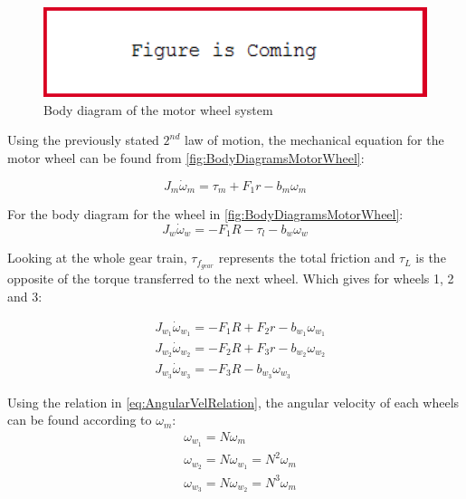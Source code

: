 \begin{figure}[htbp]
    \centering
    \includegraphics[width=1\textwidth]{figures/FigureIsComing.PNG}
    \caption{Body diagram of the motor wheel system}
    \label{fig:BodyDiagramsMotorWheel}
\end{figure}

Using the previously stated $2^{nd}$ law of motion, the mechanical equation for the motor wheel can be found from \autoref{fig:BodyDiagramsMotorWheel}:

\begin{equation}
    J_m \dot{\omega}_m = \tau_m + F_1r - b_m\omega_m
    \label{eq:MotorfreeBody}
\end{equation}

For the body diagram for the wheel in \autoref{fig:BodyDiagramsMotorWheel}:
\begin{equation}
	J_w\dot{\omega}_w = -F_1R -\tau_l -b_w\omega_w
\end{equation}

Looking at the whole gear train, $\tau_{f_{gear}}$ represents the total friction and $\tau_L$ is the opposite of the torque transferred to the next wheel. Which gives for wheels 1, 2 and 3:

\begin{subequations} 
	\begin{flalign} \label{eq:GiveMeAnOriginalName}
		&J_{w_1}\dot{\omega}_{w_1} = -F_1R + F_2r -b_{w_1}\omega_{w_1} \\ 
		&J_{w_2}\dot{\omega}_{w_2} = -F_2R + F_3r -b_{w_2}\omega_{w_2} \\ 
		&J_{w_3}\dot{\omega}_{w_3} = -F_3R - b_{w_3}\omega_{w_3} 
	\end{flalign}
\end{subequations}

Using the relation in \autoref{eq:AngularVelRelation}, the angular velocity of each wheels can be found according to $\omega_m$:
\begin{subequations} 
	\begin{flalign}
		&\omega_{w_1} = N \omega_m \\
		&\omega_{w_2} = N \omega_{w_1} = N^2 \omega_m \\
		&\omega_{w_3} = N \omega_{w_2} = N^3 \omega_m
	\end{flalign}
\end{subequations}

